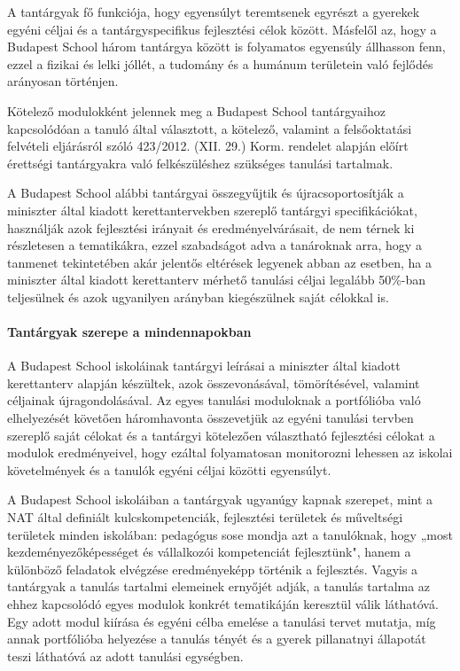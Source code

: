 A tantárgyak fő funkciója, hogy egyensúlyt teremtsenek egyrészt a gyerekek egyéni céljai és a tantárgyspecifikus fejlesztési célok között. Másfelől az, hogy a Budapest School három tantárgya között is folyamatos egyensúly állhasson fenn, ezzel a fizikai és lelki jóllét, a tudomány és a humánum területein való fejlődés arányosan történjen.

Kötelező modulokként jelennek meg a Budapest School tantárgyaihoz kapcsolódóan a tanuló által választott, a kötelező, valamint a felsőoktatási felvételi eljárásról szóló 423/2012. (XII. 29.) Korm. rendelet alapján előírt érettségi tantárgyakra való felkészüléshez szükséges tanulási tartalmak.

A Budapest School alábbi tantárgyai összegyűjtik és újracsoportosítják a miniszter által kiadott kerettantervekben szereplő tantárgyi specifikációkat, használják azok fejlesztési irányait és eredményelvárásait, de nem térnek ki részletesen a tematikákra, ezzel szabadságot adva a tanároknak arra, hogy a tanmenet tekintetében akár jelentős eltérések legyenek abban az esetben, ha a miniszter által kiadott kerettanterv mérhető tanulási céljai legalább 50\%-ban teljesülnek és azok ugyanilyen arányban kiegészülnek saját célokkal is.

\paragraph{Tantárgyak szerepe a mindennapokban}

A Budapest School iskoláinak tantárgyi leírásai a miniszter által kiadott kerettanterv alapján készültek, azok összevonásával, tömörítésével, valamint céljainak újragondolásával. Az egyes tanulási moduloknak a portfólióba való elhelyezését követően háromhavonta összevetjük az egyéni tanulási tervben szereplő saját célokat és a tantárgyi kötelezően választható fejlesztési célokat a modulok eredményeivel, hogy ezáltal folyamatosan monitorozni lehessen az iskolai követelmények és a tanulók egyéni céljai közötti egyensúlyt.

A Budapest School iskoláiban a tantárgyak ugyanúgy kapnak szerepet, mint a NAT által definiált kulcskompetenciák, fejlesztési területek és műveltségi területek minden iskolában: pedagógus sose mondja azt a tanulóknak, hogy „most kezdeményezőképességet és vállalkozói kompetenciát fejlesztünk", hanem a különböző feladatok elvégzése eredményeképp történik a fejlesztés. Vagyis a tantárgyak a tanulás tartalmi elemeinek ernyőjét adják, a tanulás tartalma az ehhez kapcsolódó egyes modulok konkrét tematikáján keresztül válik láthatóvá. Egy adott modul kiírása és egyéni célba emelése a tanulási tervet mutatja, míg annak portfólióba helyezése a tanulás tényét és a gyerek pillanatnyi állapotát teszi láthatóvá az adott tanulási egységben.

